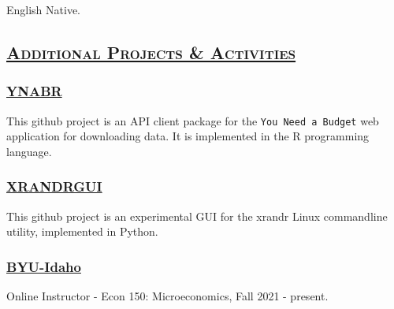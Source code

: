 \documentclass[
  letterpaper,
  DIV=11,
  numbers=noendperiod]{scrartcl}
\begin{document}
English Native.

\hypertarget{additional-projects-activities}{%
\subsection{\texorpdfstring{\textsc{\uline{Additional Projects \&
Activities}}}{Additional Projects \& Activities}}\label{additional-projects-activities}}

\hypertarget{ynabr}{%
\subsubsection{\texorpdfstring{\href{http://joxborrow.github.io/ynabr}{YNABR}}{YNABR}}\label{ynabr}}

This github project is an API client package for the
\texttt{You\ Need\ a\ Budget} web application for downloading data. It
is implemented in the R programming language.

\hypertarget{xrandrgui}{%
\subsubsection{\texorpdfstring{\href{https://github.com/joxborrow/xrandrgui}{XRANDRGUI}}{XRANDRGUI}}\label{xrandrgui}}

This github project is an experimental GUI for the xrandr Linux
commandline utility, implemented in Python.

\hypertarget{byu-idaho}{%
\subsubsection{\texorpdfstring{\href{http://www.byui.edu}{BYU-Idaho}}{BYU-Idaho}}\label{byu-idaho}}

Online Instructor - Econ 150: Microeconomics, Fall 2021 - present.
\end{document}
